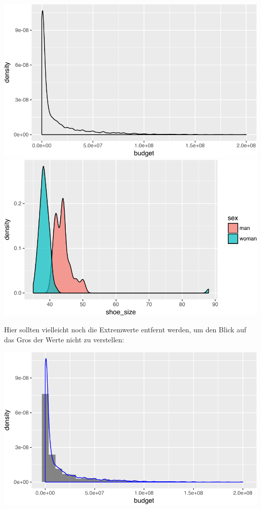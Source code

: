 \documentclass[12pt,ngerman,]{book}
\newenvironment{Shaded}{\begin{snugshade}}{\end{snugshade}}
\newcommand{\KeywordTok}[1]{\textcolor[rgb]{0.13,0.29,0.53}{\textbf{{#1}}}}
\newcommand{\DataTypeTok}[1]{\textcolor[rgb]{0.13,0.29,0.53}{{#1}}}
\newcommand{\DecValTok}[1]{\textcolor[rgb]{0.00,0.00,0.81}{{#1}}}
\newcommand{\StringTok}[1]{\textcolor[rgb]{0.31,0.60,0.02}{{#1}}}
\newcommand{\NormalTok}[1]{{#1}}
\renewenvironment{Shaded}{\begin{kframe}}{\end{kframe}}
\begin{document}
\begin{center}\includegraphics[width=0.7\linewidth]{050_Daten_visualisieren_files/figure-latex/unnamed-chunk-9-1} \includegraphics[width=0.7\linewidth]{050_Daten_visualisieren_files/figure-latex/unnamed-chunk-9-2} \end{center}

Hier sollten vielleicht noch die Extremwerte entfernt werden, um den
Blick auf das Gros der Werte nicht zu verstellen:

\begin{Shaded}
\end{Shaded}

\begin{center}\includegraphics[width=0.7\linewidth]{050_Daten_visualisieren_files/figure-latex/unnamed-chunk-10-1} \end{center}
\end{document}
